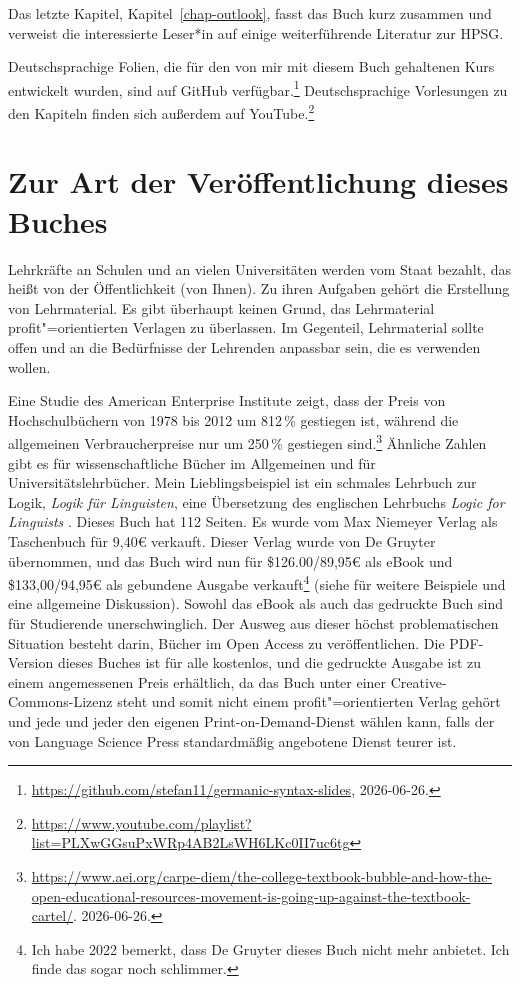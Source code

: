 
Das letzte Kapitel, Kapitel~\ref{chap-outlook}, fasst das Buch kurz zusammen und
verweist die interessierte Leser*in auf einige weiterführende Literatur zur HPSG.

Deutschsprachige Folien, die für den von mir mit diesem Buch gehaltenen Kurs entwickelt wurden, sind auf GitHub verfügbar.\footnote{
\url{https://github.com/stefan11/germanic-syntax-slides}, 2026-06-26.
}
Deutschsprachige Vorlesungen zu den Kapiteln finden sich außerdem auf YouTube.\footnote{
\url{https://www.youtube.com/playlist?list=PLXwGGsuPxWRp4AB2LsWH6LKc0II7uc6tg}
}

\section*{Zur Art der Veröffentlichung dieses Buches}

Lehrkräfte an Schulen und an vielen Universitäten werden vom Staat bezahlt, das heißt von der Öffentlichkeit (von Ihnen). Zu
ihren Aufgaben gehört die Erstellung von Lehrmaterial. Es gibt überhaupt keinen Grund, das
Lehrmaterial profit"=orientierten Verlagen zu überlassen. Im Gegenteil, Lehrmaterial sollte offen
und an die Bedürfnisse der Lehrenden anpassbar sein, die es verwenden wollen.

Eine Studie des American Enterprise Institute zeigt, dass der Preis von Hochschulbüchern von 1978 bis 2012 um 812\,\%
gestiegen ist, während die allgemeinen Verbraucherpreise nur um 250\,\% gestiegen sind.\footnote{
\url{https://www.aei.org/carpe-diem/the-college-textbook-bubble-and-how-the-open-educational-resources-movement-is-going-up-against-the-textbook-cartel/}.
2026-06-26.%
} Ähnliche Zahlen gibt es für wissenschaftliche Bücher im Allgemeinen und für Universitätslehrbücher. Mein Lieblingsbeispiel ist ein schmales Lehrbuch
zur Logik, \emph{Logik für Linguisten}, eine Übersetzung des englischen Lehrbuchs \emph{Logic for
Linguists} \citep*{AAD73a}. Dieses Buch hat 112 Seiten. Es wurde vom Max Niemeyer
Verlag als Taschenbuch für 9,40€ verkauft. Dieser Verlag wurde von De Gruyter übernommen, und das Buch wird nun für \$126.00/89,95€ als
eBook und \$133,00/94,95€ als gebundene Ausgabe verkauft\footnote{
Ich habe 2022 bemerkt, dass De Gruyter dieses Buch nicht mehr anbietet. Ich finde das sogar noch schlimmer.
} (siehe \citealp{MuellerOA} für weitere Beispiele und eine allgemeine Diskussion). Sowohl das eBook als auch das gedruckte Buch sind für Studierende unerschwinglich. Der Ausweg aus dieser höchst
problematischen Situation besteht darin, Bücher im Open Access zu veröffentlichen. Die PDF-Version dieses Buches ist für
alle kostenlos, und die gedruckte Ausgabe ist zu einem angemessenen Preis erhältlich, da das Buch unter
einer Creative-Commons-Lizenz steht und somit nicht einem
profit"=orientierten Verlag gehört und jede und jeder den eigenen Print-on-Demand-Dienst wählen kann, falls
der von Language Science Press standardmäßig angebotene Dienst teurer ist.

